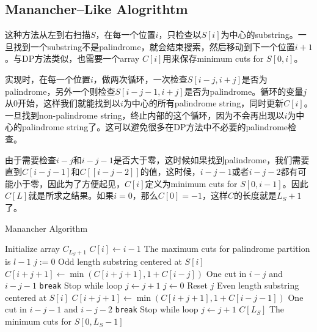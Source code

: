 \subsection{Manancher--Like Alogrithtm}
这种方法从左到右扫描$S$，在每一个位置$i$，只检查以$S[i]$为中心的substring。一旦找到一个substring不是palindrome，就会结束搜索，然后移动到下一个位置$i+1$。与DP方法类似，也需要一个array $C[i]$用来保存minimum cuts for $S[0, i]$。
\par
实现时，在每一个位置$i$，做两次循环，一次检查$S[i-j, i+j]$是否为palindrome，另外一个则检查$S[i-j-1,i+j]$是否为palindrome。循环的变量$j$从0开始，这样我们就能找到以$i$为中心的所有palindrome string，同时更新$C[i]$。一旦找到non-palindrome string，终止内部的这个循环，因为不会再出现以$i$为中心的palindrome string了。这可以避免很多在DP方法中不必要的palindrome检查。
\par
由于需要检查$i-j$和$i-j-1$是否大于零，这时候如果找到palindrome，我们需要直到$C[i-j-1]$和$C[[i-j-2]]$的值，这时候，$i-j-1$或者$i-j-2$都有可能小于零，因此为了方便起见，$C[i]$定义为minimum cuts for $S[0, i-1]$。因此$C[L]$就是所求之结果。如果$i=0$，那么$C[0]=-1$，这样$C$的长度就是$L_S+1$了。
\begin{algorithm}[H]
\caption{Manancher Algorithm}
\begin{algorithmic}[1]
\State Initialize array $C_{L_S+1}$
\State $C[i]\gets i-1$ \Comment The maximum cuts for palindrome partition is $l-1$
\EndFor
{}
\State $j:=0$
 \Comment Odd length substring centered at $S[i]$
\State $C[i+j+1]\gets \min(C[i+j+1], 1 + C[i-j])$ \Comment One cut in $i-j$ and $i-j-1$
\Else
\State \texttt{break} \Comment Stop while loop
\EndIf
\State $j\gets j+1$
\EndWhile
\State $j\gets 0$ \Comment Reset $j$
 \Comment Even length substring centered at $S[i]$
\State $C[i+j+1]\gets \min(C[i+j+1], 1 + C[i-j-1])$ \Comment One cut in $i-j-1$ and $i-j-2$
\Else
\State \texttt{break} \Comment Stop while loop
\EndIf
\State $j\gets j+1$
\EndWhile
\EndFor
\State \Return $C[L_S]$ \Comment The minimum cuts for $S[0, L_S-1]$
\EndProcedure
\end{algorithmic}
\end{algorithm}
